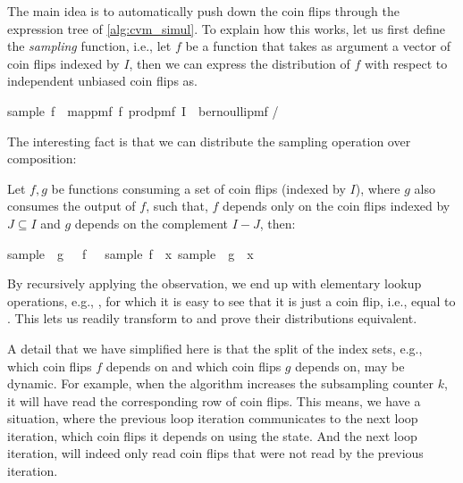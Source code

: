 The main idea is to automatically push down the coin flips through the expression tree of \cref{alg:cvm_simul}.
To explain how this works, let us first define the \emph{sampling} function, i.e., let $f$ be a function that takes as argument a vector of coin flips indexed by $I$, then we can express the distribution of $f$ with respect to independent unbiased coin flips as.
\begin{isabelle_cm}
  sample\ f\ \isacharequal\ map{\isacharunderscore}pmf\ f\ {\isacharparenleft}prod{\isacharunderscore}pmf\ I\ {\isacharparenleft}\isasymlambda\isacharunderscore\isachardot\ bernoulli{\isacharunderscore}pmf \isacharparenleft{}/\isacharparenright\isacharparenright\isacharparenright
\end{isabelle_cm}
The interesting fact is that we can distribute the sampling operation over composition:
\begin{observation}\label{o:sample_distrib} Let $f,g$ be functions consuming a set of coin flips (indexed by $I$), where $g$ also consumes the output of $f$, such that,
$f$ depends only on the coin flips indexed by $J \subseteq I$ and $g$ depends on the complement $I - J$, then:
\begin{isabelle_cm}
  sample\ \isacharparenleft\isasymlambda\isasymomega\isachardot\ g\ \isasymomega\ \isasymcirc\ f\ \isasymomega{\isacharparenright}\ \isacharequal\ sample\ f\ \isasymbind\ \isacharparenleft{\isasymlambda}x\isachardot\ sample\ \isacharparenleft\isasymlambda\isasymomega\isachardot\ g\ \isasymomega\ x\isacharparenright\isacharparenright
\end{isabelle_cm}
\end{observation}
By recursively applying the observation, we end up with elementary lookup operations, e.g., , for which it is easy to see that it is just a coin flip, i.e., equal to .
This lets us readily transform  to  and prove their distributions equivalent.

A detail that we have simplified here is that the split of the index sets, e.g., which coin flips $f$ depends on and which coin flips $g$ depends on, may be dynamic.
For example, when the algorithm increases the subsampling counter $k$, it will have read the corresponding row of coin flips.
This means, we have a situation, where the previous loop iteration communicates to the next loop iteration, which coin flips it depends on using the state.
And the next loop iteration, will indeed only read coin flips that were not read by the previous iteration.

